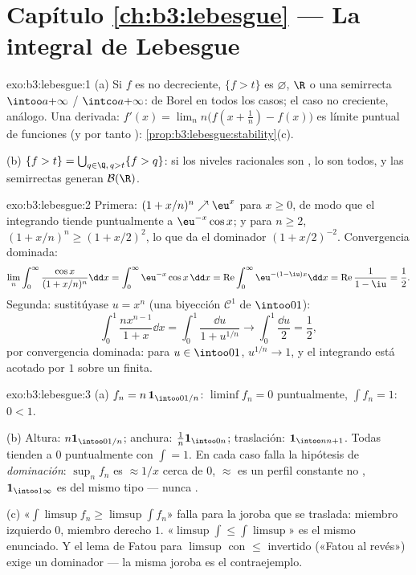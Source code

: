 \section*{Capítulo \ref{ch:b3:lebesgue} --- La integral de
Lebesgue}

\begin{solution}{exo:b3:lebesgue:1}
(a) Si $f$ es no decreciente, $\{f > t\}$ es $\varnothing$, $\R$ o una
semirrecta $\intoo a{+\infty}$ / $\intco a{+\infty}$: de Borel en todos
los casos; el caso no creciente, análogo. Una derivada: $f'(x) =
\lim_n n\bigl(f(x + \frac1n) - f(x)\bigr)$ es límite puntual de
funciones  (y por tanto
):
\cref{prop:b3:lebesgue:stability}(c).

(b) $\{f > t\} = \bigcup_{q \in \Q,\, q > t}\{f > q\}$: si los niveles
racionales son , lo son
todos, y las semirrectas generan $\mathcal B(\R)$.
\end{solution}

\begin{solution}{exo:b3:lebesgue:2}
Primera: $(1 + x/n)^n \nearrow \eu^x$ para $x \geq 0$, de modo que el
integrando tiende puntualmente a $\eu^{-x}\cos x$; y para $n \geq 2$,
$(1 + x/n)^n \geq (1 + x/2)^2$, lo que da el dominador
 $(1 + x/2)^{-2}$. Convergencia
dominada:
\[
\lim_n\int_0^\infty\frac{\cos x}{(1 + x/n)^n}\dd x
= \int_0^\infty \eu^{-x}\cos x\,\dd x
= \operatorname{Re}\int_0^\infty\eu^{-(1 - \iu)x}\dd x
= \operatorname{Re}\frac{1}{1 - \iu} = \frac12 .
\]
Segunda: sustitúyase $u = x^n$ (una biyección $\mathcal C^1$ de
$\intoo01$):
\[
\int_0^1\frac{nx^{n-1}}{1 + x}\dd x = \int_0^1\frac{\dd u}{1 +
u^{1/n}} \longrightarrow \int_0^1\frac{\dd u}{2} = \frac12,
\]
por convergencia dominada: para $u \in \intoo01$, $u^{1/n} \to 1$, y el
integrando está acotado por $1$ sobre un
 finita.
\end{solution}

\begin{solution}{exo:b3:lebesgue:3}
(a) $f_n = n\,\mathbf 1_{\intoo0{1/n}}$: $\liminf f_n = 0$
puntualmente, $\int f_n = 1$: $0 < 1$.

(b) Altura: $n\mathbf 1_{\intoo0{1/n}}$; anchura: $\frac1n\mathbf
1_{\intoo0n}$; traslación: $\mathbf 1_{\intoo n{n+1}}$. Todas tienden a
$0$ puntualmente con $\int = 1$. En cada caso falla la hipótesis de
\emph{dominación}: $\sup_nf_n$ es $\approx 1/x$ cerca de $0$, $\approx$
es un perfil constante no , $\mathbf 1_{\intoo1\infty}$ es del
mismo tipo --- nunca .

(c) «$\int\limsup f_n \geq \limsup\int f_n$» falla para la joroba que se
traslada: miembro izquierdo $0$, miembro derecho $1$.
«$\limsup\int \leq \int\limsup$» es el mismo enunciado. Y el lema de
Fatou para $\limsup$ con $\leq$ invertido («Fatou al revés») exige un
dominador --- la misma joroba es el contraejemplo.
\end{solution}

